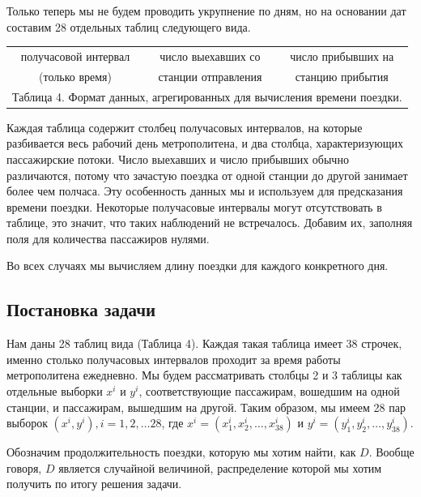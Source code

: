 \documentclass[12pt, fleqn, titlepage]{article}
\begin{document}
    Только теперь мы не будем проводить укрупнение по дням, но на основании дат составим 28 отдельных таблиц следующего вида.

    \begin{center}
    \begin{tabular}{ |c|c|c| } 
        
        \hline
        получасовой интервал & число выехавших со & число прибывших на \\
        (только время) & станции отправления & станцию прибытия \\
        \hline
        \multicolumn{3}{c}{\footnotesize Таблица 4.
        Формат данных, агрегированных для вычисления времени поездки.} \\
        
    \end{tabular}
    \end{center}

    Каждая таблица содержит столбец получасовых интервалов, на которые разбивается весь рабочий день метрополитена, и два 
    столбца, характеризующих пассажирские потоки. Число выехавших и число прибывших обычно различаются, потому что зачастую 
    поездка от одной станции до другой занимает более чем полчаса. Эту особенность данных мы и используем для предсказания времени 
    поездки. Некоторые получасовые интервалы могут отсутствовать в таблице, это значит, что таких наблюдений не встречалось. 
    Добавим их, заполняя поля для количества пассажиров нулями.

    Во всех случаях мы вычисляем длину поездки для каждого конкретного дня.

    \subsection{Постановка задачи}

    Нам даны 28 таблиц вида (Таблица 4). Каждая такая таблица имеет 38 строчек, именно столько получасовых интервалов проходит за 
    время работы метрополитена ежедневно. Мы будем рассматривать столбцы 2 и 3 таблицы как отдельные выборки $x^i$ и $y^i$, соответствующие 
    пассажирам, вошедшим на одной станции, и пассажирам, вышедшим на другой. Таким образом, мы имеем 28 пар выборок $(x^i, y^i), i = 1, 2, \dots 28$, 
    где $x^i = (x^i_1, x^i_2, \dots, x^i_{38})$ и $y^i = (y^i_1, y^i_2, \dots, y^i_{38})$.

    Обозначим продолжительность поездки, которую мы хотим найти, как $D$. Вообще говоря, $D$ является случайной величиной, распределение 
    которой мы хотим получить по итогу решения задачи.
\end{document}
